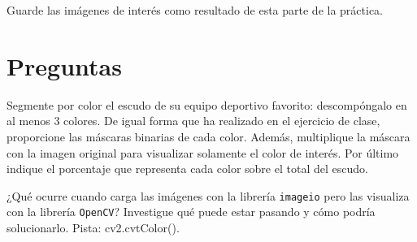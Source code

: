 Guarde las imágenes de interés como resultado de esta parte de la práctica.

\section*{Preguntas}

\vspace{5mm}
\begin{tcolorbox}[colback=gray!10, colframe=gray!30, coltitle=black, title=Pregunta B.1, halign=left]
Segmente por color el escudo de su equipo deportivo favorito: descompóngalo en al menos 3 colores. De igual forma que ha realizado en el ejercicio de clase, proporcione las máscaras binarias de cada color. Además, multiplique la máscara con la imagen original para visualizar solamente el color de interés. Por último indique el porcentaje que representa cada color sobre el total del escudo.
\end{tcolorbox}

\vspace{5mm}
\begin{tcolorbox}[colback=gray!10, colframe=gray!30, coltitle=black, title=Pregunta B.2, halign=left]
¿Qué ocurre cuando carga las imágenes con la librería \texttt{imageio} pero las visualiza con la librería \texttt{OpenCV}? Investigue qué puede estar pasando y cómo podría solucionarlo. Pista: cv2.cvtColor().
\end{tcolorbox}